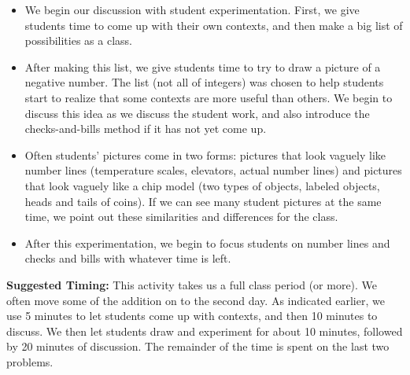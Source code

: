 \documentclass[nooutcomes]{ximera}
\begin{document}
\begin{instructorNotes}
\begin{itemize}
    \item We begin our discussion with student experimentation.  First, we give students time to come up with their own contexts, and then make a big list of possibilities as a class.
    \item After making this list, we give students time to try to draw a picture of a negative number.  The list (not all of integers) was chosen to help students start to realize that some contexts are more useful than others.  We begin to discuss this idea as we discuss the student work, and also introduce the checks-and-bills method if it has not yet come up.
    \item Often students' pictures come in two forms: pictures that look vaguely like number lines (temperature scales, elevators, actual number lines) and pictures that look vaguely like a chip model (two types of objects, labeled objects, heads and tails of coins).  If we can see many student pictures at the same time, we point out these similarities and differences for the class.
    \item After this experimentation, we begin to focus students on number lines and checks and bills with whatever time is left.
\end{itemize}

{\bf Suggested Timing:} This activity takes us a full class period (or more).  We often move some of the addition on to the second day.  As indicated earlier, we use 5 minutes to let students come up with contexts, and then 10 minutes to discuss.  We then let students draw and experiment for about 10 minutes, followed by 20 minutes of discussion.  The remainder of the time is spent on the last two problems.
\end{instructorNotes}
\end{document}

